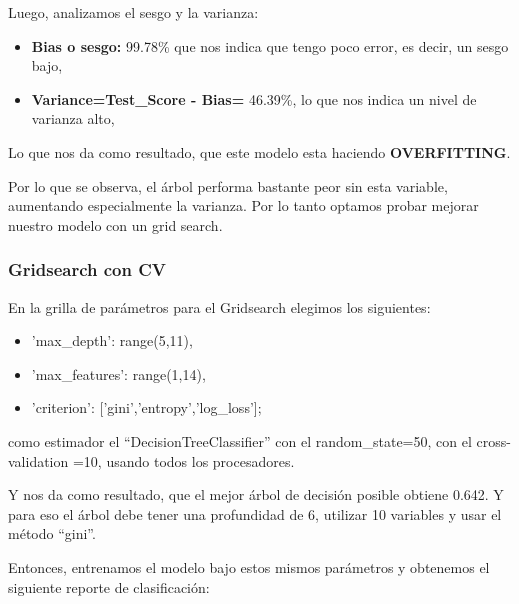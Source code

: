 \documentclass[a4paper]{article}
\begin{document}
            Luego, analizamos el sesgo y la varianza:
            \begin{itemize}
                \item \textbf{Bias o sesgo:} 99.78\% que nos indica que tengo poco error, es decir, un sesgo bajo,
                \item \textbf{Variance=Test\_Score - Bias=} 46.39\%, lo que nos indica un nivel de varianza alto,
            \end{itemize}
            
            Lo que nos da como resultado, que este modelo esta haciendo \textbf{OVERFITTING}.

            Por lo que se observa, el árbol performa bastante peor sin esta variable, aumentando especialmente la varianza. Por lo tanto optamos probar mejorar nuestro modelo con un grid search.
        
        \subsubsection{Gridsearch con CV}
            
            En la grilla de parámetros para el Gridsearch elegimos los siguientes:
            \begin{itemize}
                \item 'max\_depth': range(5,11),
                \item 'max\_features': range(1,14),
                \item 'criterion': ['gini','entropy','log\_loss'];
            \end{itemize}
            como estimador el ``DecisionTreeClassifier'' con el random\_state=50, con el cross-validation =10,  usando todos los procesadores.

            Y nos da como resultado, que el mejor árbol de decisión posible obtiene 0.642. Y para eso el árbol debe tener una profundidad de  6, utilizar  10  variables y usar el método ``gini''.

            Entonces, entrenamos el modelo bajo estos mismos parámetros y obtenemos el siguiente reporte de clasificación:
\end{document}
